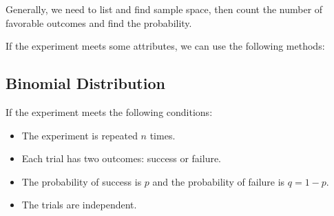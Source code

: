 \documentclass[12pt,a4paper]{article}
\begin{document}
Generally, we need to list and find sample space, then count the number of favorable outcomes and find the probability.

If the experiment meets some attributes, we can use the following methods:

\subsection*{Binomial Distribution}

If the experiment meets the following conditions:

\begin{itemize}
    \item The experiment is repeated $n$ times.
    \item Each trial has two outcomes: success or failure.
    \item The probability of success is $p$ and the probability of failure is $q = 1 - p$.
    \item The trials are independent.
\end{itemize}

\subsection*{}
\end{document}
